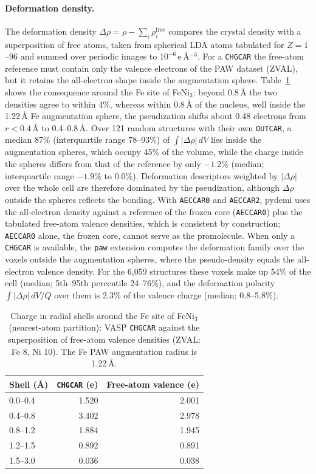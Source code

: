 \documentclass[11pt,a4paper]{article}
\begin{document}
\paragraph{Deformation density.} The deformation density
$\Delta\rho=\rho-\sum_i\rho^{\mathrm{free}}_i$ compares the crystal density
with a superposition of free atoms, taken from spherical LDA atoms tabulated
for $Z=1$--96 and summed over periodic images to $10^{-6}$\,e\,\AA$^{-3}$. For a
\texttt{CHGCAR} the free-atom reference must contain only the valence
electrons of the PAW dataset (ZVAL), but it retains the all-electron shape
inside the augmentation sphere. Table~\ref{tab:feni3} shows the consequence
around the Fe site of FeNi$_3$: beyond 0.8\,\AA{} the two densities agree to
within 4\%, whereas within 0.8\,\AA{} of the nucleus, well inside the
1.22\,\AA{} Fe augmentation sphere, the pseudization shifts about 0.48
electrons from $r<0.4$\,\AA{} to 0.4--0.8\,\AA. Over 121 random structures
with their own \texttt{OUTCAR}, a median 87\% (interquartile range 78--93\%) of
$\int|\Delta\rho|\,dV$ lies inside the augmentation spheres, which occupy 45\%
of the volume, while the charge inside the spheres differs from that of the
reference by only $-1.2\%$ (median; interquartile range $-1.9\%$ to $0.0\%$).
Deformation descriptors weighted by $|\Delta\rho|$ over the whole cell are
therefore dominated by the pseudization, although $\Delta\rho$ outside the
spheres reflects the bonding. With \texttt{AECCAR0} and \texttt{AECCAR2}, pydemi
uses the all-electron density against a reference of the frozen core
(\texttt{AECCAR0}) plus the tabulated free-atom valence densities, which is
consistent by construction; \texttt{AECCAR0} alone, the frozen core, cannot
serve as the promolecule. When only a \texttt{CHGCAR} is available, the
\texttt{paw} extension computes the deformation family over the voxels outside
the augmentation spheres, where the pseudo-density equals the all-electron
valence density. For the 6,059 structures these voxels make up 54\% of the
cell (median; 5th--95th percentile 24--76\%), and the deformation polarity
$\int|\Delta\rho|\,dV/Q$ over them is 2.3\% of the valence charge (median;
0.8--5.8\%).

\begin{table}[htbp]
\centering
\caption{Charge in radial shells around the Fe site of FeNi$_3$ (nearest-atom
partition): VASP \texttt{CHGCAR} against the superposition of free-atom
valence densities (ZVAL: Fe 8, Ni 10). The Fe PAW augmentation radius is
1.22\,\AA.}
\label{tab:feni3}
\begin{tabular}{lrr}
\toprule
Shell (\AA) & \texttt{CHGCAR} (e) & Free-atom valence (e) \\
\midrule
0.0--0.4 & 1.520 & 2.001 \\
0.4--0.8 & 3.402 & 2.978 \\
0.8--1.2 & 1.884 & 1.945 \\
1.2--1.5 & 0.892 & 0.891 \\
1.5--3.0 & 0.036 & 0.038 \\
\bottomrule
\end{tabular}
\end{table}
\end{document}
